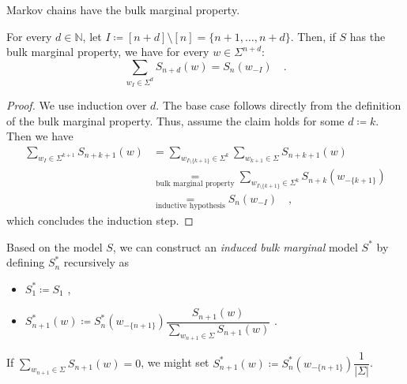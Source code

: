 \documentclass[../../main.tex]{subfiles}
\begin{document}
    \begin{remark}
        Markov chains have the bulk marginal property.
    \end{remark}

\pagebreak
    \begin{lemma}
        \label{lemma:random_variables_do_not_change_with_future_models}
        For every $d \in \mathbb{N}$, let $I \coloneqq [n + d] \setminus [n] = \{ n+1, \dots, n + d \}$. Then, if $S$ has the bulk marginal property, we have for every $w \in \Sigma^{n + d}$:
        \[
            \sum_{w_I \in \Sigma^d} S_{n + d}(w) = S_n(w_{-I}) \quad .
        \]
    \end{lemma}
    \begin{proof}
        We use induction over $d$. The base case follows directly from the definition of the bulk marginal property. Thus, assume the claim holds for some $d \coloneqq k$. Then we have
        \begin{align*}
            \sum_{w_I \in \Sigma^{k + 1}} S_{n + k + 1}(w) &= \sum_{w_{I \setminus \{ k + 1 \}} \in \Sigma^{k}} \sum_{w_{k + 1} \in \Sigma} S_{n + k + 1}(w) \\
            &\underset{\text{bulk marginal property}}{=} \sum_{w_{I \setminus \{ k + 1 \}} \in \Sigma^{k}} S_{n + k}(w_{-\{ k + 1 \}}) \\
            &\underset{\text{inductive hypothesis}}{=} S_n(w_{-I}) \quad ,
        \end{align*}
        which concludes the induction step.
    \end{proof}

    \begin{definition}
        \label{def:induced_bulk_marginal_model}
        Based on the model $S$, we can construct an \emph{induced bulk marginal} model $S^*$ by defining $S_n^*$ recursively as 
        \begin{itemize}
            \item $S_1^* \coloneqq S_1$ ,
            \item $S_{n + 1}^*(w) \coloneqq S_n^*(w_{-\{n+1\}}) \dfrac{S_{n+1}(w)}{\sum_{w_{n+1} \in \Sigma} S_{n+1}(w)}$ .
        \end{itemize}
    \end{definition}

    \begin{remark}
        If $\sum_{w_{n+1} \in \Sigma} S_{n+1}(w) = 0$, we might set $S_{n + 1}^*(w) \coloneqq S_n^*(w_{-\{n+1\}}) \dfrac{1}{|\Sigma|}$.
    \end{remark}
\end{document}
